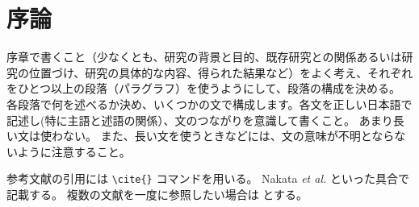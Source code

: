 \setcounter{chapter}{0}
\chapter{序論}
序章で書くこと（少なくとも、研究の背景と目的、既存研究との関係あるいは研究の位置づけ、研究の具体的な内容、得られた結果など）をよく考え、それぞれをひとつ以上の段落（パラグラフ）を使うようにして、段落の構成を決める。
各段落で何を述べるか決め、いくつかの文で構成します。各文を正しい日本語で記述し(特に主語と述語の関係）、文のつながりを意識して書くこと。
あまり長い文は使わない。
また、長い文を使うときなどには、文の意味が不明とならないように注意すること。

参考文献の引用には \verb|\cite{}| コマンドを用いる。
Nakata \textit{et al.} \cite{Nakata2003} といった具合で記載する。
複数の文献を一度に参照したい場合は \cite{Nakata2003,Fukuda2001} とする。